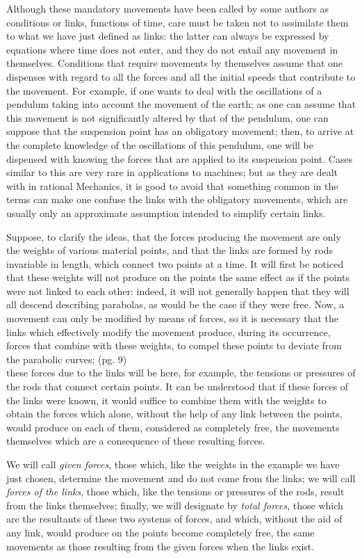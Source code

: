 \documentclass{book}
\begin{document}
Although these mandatory movements have been called by some authors as conditions or links, functions of time, care must be taken not to assimilate them to what we have just defined as links: the latter can always be expressed by equations where time does not enter, and they do not entail any movement in themselves. Conditions that require movements by themselves assume that one dispenses with regard to all the forces and all the initial speeds that contribute to the movement. For example, if one wants to deal with the oscillations of a pendulum taking into account the movement of the earth; as one can assume that this movement is not significantly altered by that of the pendulum, one can suppose that the suspension point has an obligatory movement; then, to arrive at the complete knowledge of the oscillations of this pendulum, one will be dispensed with knowing the forces that are applied to its suspension point. Cases similar to this are very rare in applications to machines; but as they are dealt with in rational Mechanics, it is good to avoid that something common in the terms can make one confuse the links with the obligatory movements, which are usually only an approximate assumption intended to simplify certain links.

Suppose, to clarify the ideas, that the forces producing the movement are only the weights of various material points, and that the links are formed by rods invariable in length, which connect two points at a time. It will first be noticed that these weights will not produce on the points the same effect as if the points were not linked to each other: indeed, it will not generally happen that they will all descend describing parabolas, as would be the case if they were free. Now, a movement can only be modified by means of forces, so it is necessary that the links which effectively modify the movement produce, during its occurrence, forces that combine with these weights, to compel these points to deviate from the parabolic curves; 
\newpage
(pg. 9)\\
these forces due to the links will be here, for example, the tensions or pressures of the rods that connect certain points. It can be understood that if these forces of the links were known, it would suffice to combine them with the weights to obtain the forces which alone, without the help of any link between the points, would produce on each of them, considered as completely free, the movements themselves which are a consequence of these resulting forces.

We will call \textit{given forces}, those which, like the weights in the example we have just chosen, determine the movement and do not come from the links; we will call \textit{forces of the links}, those which, like the tensions or pressures of the rods, result from the links themselves; finally, we will designate by \textit{total forces}, those which are the resultants of these two systems of forces, and which, without the aid of any link, would produce on the points become completely free, the same movements as those resulting from the given forces when the links exist.
\end{document}
